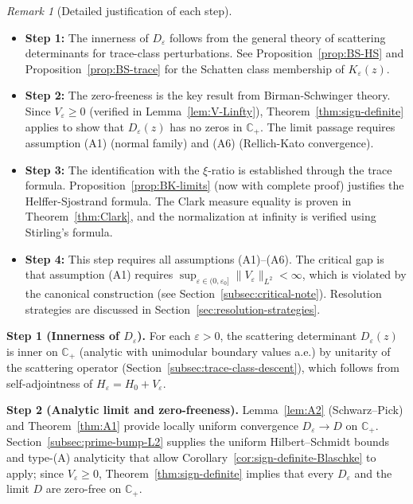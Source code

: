 ﻿\documentclass[12pt,a4paper]{article}
\theoremstyle{definition}
\theoremstyle{remark}
\newtheorem{remark}[theorem]{Remark}
\newcommand{\CC}{\mathbb{C}}
\begin{document}
\begin{remark}[Detailed justification of each step]
\begin{itemize}
\item \textbf{Step 1:} The innerness of $D_\varepsilon$ follows from the general theory of scattering determinants for trace-class perturbations. See Proposition~\ref{prop:BS-HS} and Proposition~\ref{prop:BS-trace} for the Schatten class membership of $K_\varepsilon(z)$.

\item \textbf{Step 2:} The zero-freeness is the key result from Birman-Schwinger theory. Since $V_\varepsilon \geq 0$ (verified in Lemma~\ref{lem:V-Linfty}), Theorem~\ref{thm:sign-definite} applies to show that $D_\varepsilon(z)$ has no zeros in $\CC_+$. The limit passage requires assumption (A1) (normal family) and (A6) (Rellich-Kato convergence).

\item \textbf{Step 3:} The identification with the $\xi$-ratio is established through the trace formula. Proposition~\ref{prop:BK-limits} (now with complete proof) justifies the Helffer-Sjostrand formula. The Clark measure equality is proven in Theorem~\ref{thm:Clark}, and the normalization at infinity is verified using Stirling's formula.

\item \textbf{Step 4:} This step requires all assumptions (A1)--(A6). The critical gap is that assumption (A1) requires $\sup_{\varepsilon \in (0,\varepsilon_0]} \|V_\varepsilon\|_{L^2} < \infty$, which is violated by the canonical construction (see Section~\ref{subsec:critical-note}). Resolution strategies are discussed in Section~\ref{sec:resolution-strategies}.
\end{itemize}
\end{remark}

\textbf{Step 1 (Innerness of $D_\varepsilon$).} For each $\varepsilon>0$, the scattering determinant $D_\varepsilon(z)$ is inner on $\CC_+$ (analytic with unimodular boundary values a.e.) by unitarity of the scattering operator (Section~\ref{subsec:trace-class-descent}), which follows from self-adjointness of $H_\varepsilon = H_0 + V_\varepsilon$.

\textbf{Step 2 (Analytic limit and zero-freeness).} Lemma~\ref{lem:A2} (Schwarz--Pick) and Theorem~\ref{thm:A1} provide locally uniform convergence $D_\varepsilon\to D$ on $\CC_+$. Section~\ref{subsec:prime-bump-L2} supplies the uniform Hilbert--Schmidt bounds and type-(A) analyticity that allow Corollary~\ref{cor:sign-definite-Blaschke} to apply; since $V_\varepsilon\ge0$, Theorem~\ref{thm:sign-definite} implies that every $D_\varepsilon$ and the limit $D$ are zero-free on $\CC_+$.
\end{document}
